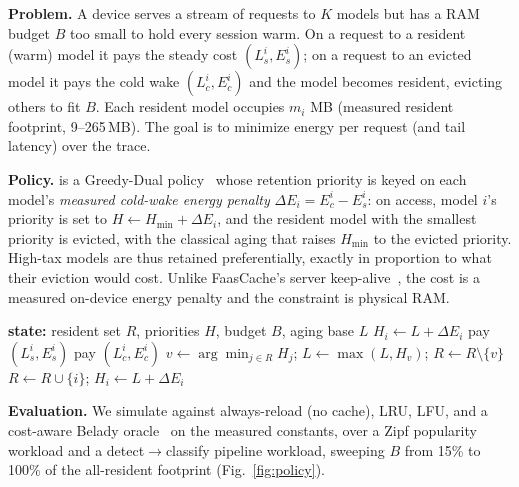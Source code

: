 \textbf{Problem.} A device serves a stream of requests to $K$ models but has a RAM budget $B$ too
small to hold every session warm. On a request to a resident (warm) model it pays the steady cost
$(L_s^i, E_s^i)$; on a request to an evicted model it pays the cold wake $(L_c^i, E_c^i)$ and the
model becomes resident, evicting others to fit $B$. Each resident model occupies $m_i$ MB
(measured resident footprint, 9--265\,MB). The goal is to minimize energy per request (and tail
latency) over the trace.

\textbf{Policy.} \gdtax{} is a Greedy-Dual policy~\cite{cao1997greedydual} whose retention
priority is keyed on each model's \emph{measured cold-wake energy penalty}
$\Delta E_i = E_c^i - E_s^i$: on access, model $i$'s priority is set to $H\!\leftarrow\! H_{\min}
+ \Delta E_i$, and the resident model with the smallest priority is evicted, with the classical
aging that raises $H_{\min}$ to the evicted priority. High-tax models are thus retained
preferentially, exactly in proportion to what their eviction would cost. Unlike FaasCache's
server keep-alive~\cite{fuerst2021faascache}, the cost is a measured on-device energy penalty and
the constraint is physical RAM.

\begin{algorithm}[t]
\caption{\gdtax{} residency on a request to model $i$}
\label{alg:gdtax}
\begin{algorithmic}[1]
\State \textbf{state:} resident set $R$, priorities $H$, budget $B$, aging base $L$
 
  \State $H_i \gets L + \Delta E_i$ 
  \State pay $(L_s^i, E_s^i)$
\Else {}
  \State pay $(L_c^i, E_c^i)$
    \State $v \gets \arg\min_{j\in R} H_j$; \; $L \gets \max(L, H_v)$; \; $R \gets R\setminus\{v\}$
  \EndWhile
  \State $R \gets R\cup\{i\}$; \; $H_i \gets L + \Delta E_i$
\EndIf
\end{algorithmic}
\end{algorithm}

\textbf{Evaluation.} We simulate \gdtax{} against always-reload (no cache), LRU, LFU, and a
cost-aware Belady oracle~\cite{belady1966study} on the measured constants, over a Zipf popularity
workload and a detect$\rightarrow$classify pipeline workload, sweeping $B$ from 15\% to 100\% of
the all-resident footprint (Fig.~\ref{fig:policy}). \POLICYPARA

